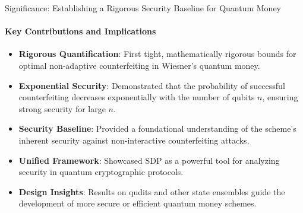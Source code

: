 \documentclass{beamer}
\begin{document}
\begin{frame}{Significance: Establishing a Rigorous Security Baseline for Quantum Money}
    \framesubtitle{Key Contributions and Implications}
    \begin{itemize}
        \item \textbf{Rigorous Quantification}: First tight, mathematically rigorous bounds for optimal non-adaptive counterfeiting in Wiesner's quantum money.
        \item \textbf{Exponential Security}: Demonstrated that the probability of successful counterfeiting decreases exponentially with the number of qubits $n$, ensuring strong security for large $n$.
        \item \textbf{Security Baseline}: Provided a foundational understanding of the scheme's inherent security against non-interactive counterfeiting attacks.
        \item \textbf{Unified Framework}: Showcased SDP as a powerful tool for analyzing security in quantum cryptographic protocols.
        \item \textbf{Design Insights}: Results on qudits and other state ensembles guide the development of more secure or efficient quantum money schemes.
    \end{itemize}
\end{frame}


    
    
\end{document}
